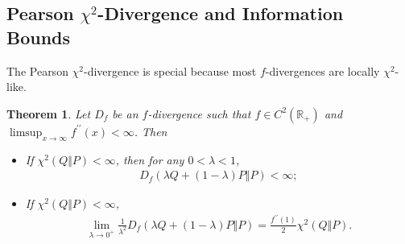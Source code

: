 \documentclass{article}
\numberwithin{equation}{section}
\newcommand{\bbR}{\mathbb{R}}
\theoremstyle{plain}
\newtheorem{theorem}{Theorem}[section]
\theoremstyle{definition}
\begin{document}
\subsection{Pearson $\chi^2$-Divergence and Information Bounds}
The Pearson $\chi^2$-divergence is special because most $f$-divergences are locally $\chi^2$-like. 
\begin{theorem}
Let $D_f$ be an $f$-divergence such that $f\in C^2(\bbR_+)$ and $\limsup_{x\to\infty}f^{\prime\prime}(x)<\infty$. Then
\begin{itemize}
\item[(i)] If $\chi^2(Q\Vert P)<\infty$, then for any $0<\lambda<1$,
\begin{align*}
	D_f(\lambda Q+(1-\lambda)P\Vert P)<\infty;
\end{align*}
\item[(ii)] If $\chi^2(Q\Vert P)<\infty$,
\begin{align}
	\lim_{\lambda\to 0^+}\frac{1}{\lambda^2}D_f(\lambda Q+(1-\lambda)P\Vert P)=\frac{f^{\prime\prime}(1)}{2}\chi^2(Q\Vert P).\label{localchisq}
\end{align}
\end{itemize}
\end{theorem}
\end{document}
